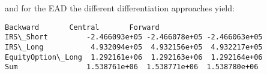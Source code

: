     and for the EAD the different differentiation approaches yield:

            \begin{tcolorbox}[breakable, size=fbox, boxrule=.5pt, pad at break*=1mm, opacityfill=0]
\begin{Verbatim}[commandchars=\\\{\}]
                       Backward       Central       Forward
IRS\_Short         -2.466093e+05 -2.466078e+05 -2.466063e+05
IRS\_Long           4.932094e+05  4.932156e+05  4.932217e+05
EquityOption\_Long  1.292161e+06  1.292163e+06  1.292164e+06
Sum                1.538761e+06  1.538771e+06  1.538780e+06
\end{Verbatim}
\end{tcolorbox}
        

